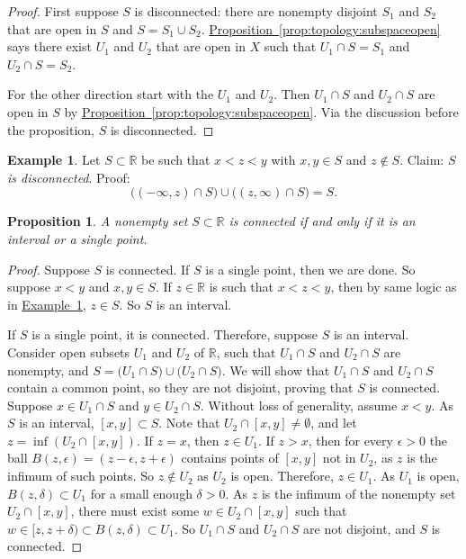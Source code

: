 \documentclass[12pt,openany]{book}
\newcommand{\R}{{\mathbb{R}}}
\theoremstyle{plain}
\newtheorem{prop}[thm]{Proposition}
\theoremstyle{remark}
\theoremstyle{definition}
\theoremstyle{exercise}
\theoremstyle{example}
\newtheorem{example}[thm]{Example}
\newcommand{\exampleref}[1]{\hyperref[#1]{Example~\ref*{#1}}}
\newcommand{\propref}[1]{\hyperref[#1]{Proposition~\ref*{#1}}}
\begin{document}
\begin{proof}
First suppose $S$ is disconnected: there are
nonempty disjoint $S_1$ and $S_2$ that are
open in $S$ and $S = S_1 \cup S_2$.
\propref{prop:topology:subspaceopen} says there exist $U_1$ and $U_2$
that are open in $X$ such that $U_1 \cap S = S_1$ and
$U_2 \cap S = S_2$.

For the other direction start with the $U_1$ and $U_2$.
Then $U_1 \cap S$ and $U_2 \cap S$ are open in $S$ by
\propref{prop:topology:subspaceopen}.
Via the discussion before the proposition, $S$ is disconnected.
\end{proof}

\begin{example}\label{example:disconnectedsetinR}
Let $S \subset \R$ be such that $x < z < y$ with $x,y \in S$
and $z \notin S$.  Claim: \emph{$S$ is disconnected}.  Proof:
\begin{equation*}
\bigl( (-\infty,z) \cap S \bigr)
\cup
\bigl( (z,\infty) \cap S \bigr)
= S .
\end{equation*}
\end{example}

\begin{prop}
A nonempty set $S \subset \R$ is connected if and only if it is
an interval or a single point.
\end{prop}

\begin{proof}
Suppose $S$ is connected.  If $S$ is a single point,
then we are done.  So suppose $x < y$ and $x,y \in S$.  If $z \in \R$ is such
that $x < z < y$, then by same logic as in
\exampleref{example:disconnectedsetinR}, $z \in S$.
So $S$ is an interval.

If $S$ is a single point, it is connected.
Therefore, suppose $S$ is an interval.
Consider open subsets $U_1$ and $U_2$ of $\R$, such that
$U_1 \cap S$ and $U_2 \cap S$ are nonempty, and
$S = 
\bigl( U_1 \cap S \bigr)
\cup
\bigl( U_2 \cap S \bigr)$.  We will show that $U_1 \cap S$
and $U_2 \cap S$ contain a common point, so they are not disjoint,
proving that $S$ is connected.
Suppose $x \in U_1 \cap S$
and $y \in U_2 \cap S$.  Without loss of generality, assume $x < y$.
As $S$ is an interval, $[x,y] \subset S$.
Note that $U_2 \cap [x,y] \not= \emptyset$, and
let $z = \inf (U_2 \cap [x,y])$.
If $z = x$, then $z \in U_1$.
If $z > x$,
then for every $\epsilon > 0$ the ball $B(z,\epsilon) =
(z-\epsilon,z+\epsilon)$ contains points of $[x,y]$ not in $U_2$,
as $z$ is the infimum of such points.
So $z \notin U_2$ as $U_2$ is open.
Therefore, $z \in U_1$. %
As $U_1$ is open,
$B(z,\delta) \subset U_1$ for a small enough $\delta > 0$.
As $z$ is the infimum of the nonempty set $U_2 \cap [x,y]$, 
there must exist some $w \in U_2 \cap [x,y]$
such that $w \in [z,z+\delta) \subset B(z,\delta) \subset U_1$.
So $U_1 \cap S$ and $U_2 \cap S$ are not disjoint, and
$S$ is connected.
\end{proof}
\end{document}
